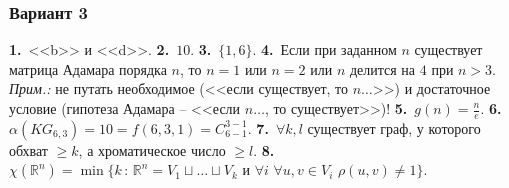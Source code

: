 \documentclass[oneside]{book}
\begin{document}
\subsubsection{Вариант 3}

\textbf{1.}~<<b>> и <<d>>.
\textbf{2.}~$10$.
\textbf{3.}~$\{1, 6\}$.
\textbf{4.}~Если при заданном $n$ существует матрица Адамара порядка $n$, то $n=1$ или $n=2$ или $n$ делится на $4$ при $n > 3$. \textit{Прим.:} не путать необходимое (<<если существует, то $n \ldots$>>) и достаточное условие (гипотеза Адамара -- <<если $n \ldots$, то существует>>)!
\textbf{5.}~$g(n) = \frac{n}{e}$.
\textbf{6.}~$\alpha(KG_{6,3}) = 10 = f(6, 3, 1) = C_{6-1}^{3-1}$.
\textbf{7.}~$\forall k, l$ существует граф, у которого обхват $\geqslant k$, а хроматическое число $\geqslant l$.
\textbf{8.}~$\chi(\mathbb{R}^n) = \min\{k\,\colon\,\mathbb{R}^n=V_1\sqcup\ldots\sqcup V_k \text{ и } \forall i \,\, \forall u, v \in V_i \,\, \rho(u, v) \neq 1 \}$.
\end{document}
